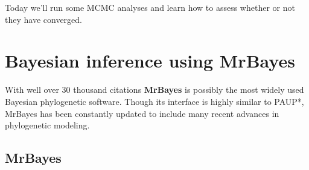 \documentclass[11pt]{article}
\begin{document}
Today we'll run some MCMC analyses and learn how to assess 
whether or not they have converged.

\section{Bayesian inference using MrBayes}

With well over 30 thousand citations \textbf{MrBayes} \citep{ronquist2012mrbayes} is possibly the most widely used Bayesian phylogenetic software.
Though its interface is highly similar to PAUP*,
MrBayes has been constantly updated to include many recent advances
in phylogenetic modeling.


\subsection{MrBayes}
\end{document}

